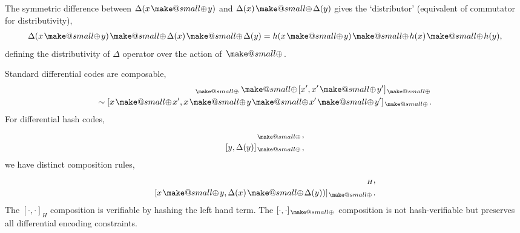 \documentclass[twocolumn, aps, amsmath, amssymb, nofootinbib, superscriptaddress, longbibliography, doublefloatfix, table-of-contents, eqsecnum, rmp]{revtex4-2}
\makeatletter
\newcommand{\soplus}{{{\hspace{1pt}}{\mathbin{\mathpalette\make@small{\mathbin\oplus}}}}{\hspace{1pt}}}
\newcommand{\make@small}[2]{%
  \vcenter{\hbox{%
    \scalebox{0.6}{$\m@th#1#2$}%
  }}%
}
\makeatother
\begin{document}




The symmetric difference between $\Delta(x\soplus y)$ and $\Delta(x)\soplus\Delta(y)$ gives the `distributor' (equivalent of commutator for distributivity),
\begin{align}
	\Delta(x\soplus y)\soplus \Delta(x)\soplus \Delta(y) = h(x\soplus y) \soplus h(x)\soplus h(y),
\end{align}
defining the distributivity of $\Delta$ operator over the action of $\soplus$.

Standard differential codes are composable,
\begin{align}
	[x,x\soplus y)]_\soplus \soplus [x',x'\soplus y']_\soplus\nonumber\\
	\sim [x\soplus x', x\soplus y \soplus x' \soplus y']_\soplus.
\end{align}
For differential hash codes,
\begin{align}
	[x,\Delta(x)]_\soplus,\nonumber\\
	[y,\Delta(y)]_\soplus,
\end{align}
we have distinct composition rules,
\begin{align}
	[x\soplus y,\Delta(x\soplus y)]_H,\nonumber\\
	[x\soplus y,\Delta(x) \soplus \Delta(y))]_\soplus.
\end{align}
The $[\cdot,\cdot]_H$ composition is verifiable by hashing the left hand term. The $[\cdot,\cdot]_\soplus$ composition is not hash-verifiable but preserves all differential encoding constraints.
\end{document}
